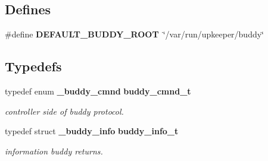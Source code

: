\subsection*{Defines}
\begin{DoxyCompactItemize}
\item 
\#define {\bf DEFAULT\_\-BUDDY\_\-ROOT}~\char`\"{}/var/run/upkeeper/buddy\char`\"{}
\end{DoxyCompactItemize}
\subsection*{Typedefs}
\begin{DoxyCompactItemize}
\item 
typedef enum {\bf \_\-buddy\_\-cmnd} {\bf buddy\_\-cmnd\_\-t}
\begin{DoxyCompactList}\small\item\em controller side of buddy protocol. \end{DoxyCompactList}\item 
typedef struct {\bf \_\-buddy\_\-info} {\bf buddy\_\-info\_\-t}
\begin{DoxyCompactList}\small\item\em information buddy returns. \end{DoxyCompactList}\end{DoxyCompactItemize}
